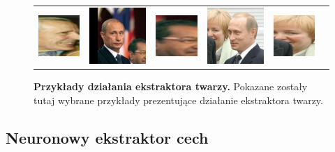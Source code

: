 \begin{figure}[H]
\begin{center}
\begin{tabular}{cc||cc||cc}
      \includegraphics[width=.15\linewidth]{img/crop_examples/after/bad/Jennifer_Lopez_0020.jpg} &
      \includegraphics[width=.15\linewidth]{img/crop_examples/before/bad/Vladimir_Putin_0031.jpg} &
      \includegraphics[width=.15\linewidth]{img/crop_examples/after/bad/Vladimir_Putin_0031.jpg} &
      \includegraphics[width=.15\linewidth]{img/crop_examples/before/bad/Vladimir_Putin_0040.jpg} &
      \includegraphics[width=.15\linewidth]{img/crop_examples/after/bad/Vladimir_Putin_0040.jpg} \\
    \end{tabular}
    \end{center}
    \caption{{\bf Przykłady działania ekstraktora twarzy.} Pokazane zostały tutaj wybrane przykłady prezentujące działanie ekstraktora twarzy.}
    \label{fig:ekstraktor_twarzy}
    \end{figure}

\subsection{Neuronowy ekstraktor cech} \label{sec:ekstraktor}

